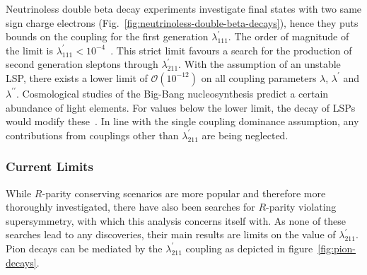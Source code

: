 Neutrinoless double beta decay experiments investigate final states with two same sign charge electrons (Fig.~\ref{fig:neutrinoless-double-beta-decays}), hence they puts bounds on the coupling for the first generation $\lambda^\prime_{111}$. The order of magnitude of the limit is  $\lambda^\prime_{111} < 10^{-4}$~\cite{rpvimpl}. This strict limit favours a search for the production of second generation sleptons through $\lambda^\prime_{211}$. With the assumption of an unstable LSP, there exists a lower limit of $\mathcal{O}(10^{-12})$ on all coupling parameters $\lambda$, $\lambda^\prime$ and $\lambda^{\prime\prime}$. Cosmological studies of the Big-Bang nucleosynthesis predict a certain abundance of light elements. For values below the lower limit, the decay of LSPs would modify these~\cite{rpvimpl}. In line with the single coupling dominance assumption, any contributions from couplings other than $\lambda^\prime_{211}$ are being neglected.

\subsubsection{Current Limits}

While $R$-parity conserving scenarios are more popular and therefore more thoroughly investigated, there have also been searches for $R$-parity violating supersymmetry, with which this analysis concerns itself with. As none of these searches lead to any discoveries, their main results are limits on the value of $\lambda^\prime_{211}$. Pion decays can be mediated by the $\lambda^\prime_{211}$ coupling as depicted in figure~\ref{fig:pion-decays}.

